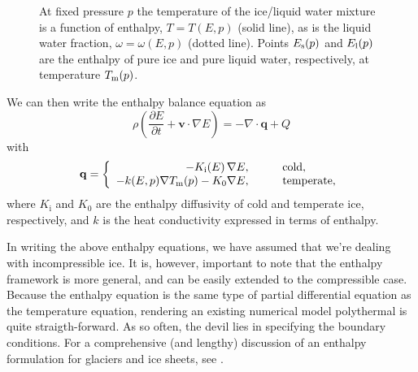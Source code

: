 \documentclass[parskip=half]{scrartcl}
\newcommand{\bq}{\mathbf{q}}
\newcommand{\bv}{\mathbf{v}}
\newcommand{\ddt}[1]{\ensuremath{\frac{\partial #1}{\partial t}}}
\newcommand{\Div}{\nabla\cdot}
\newcommand{\grad}{\nabla}
\begin{document}
\begin{figure} \centering{  }
  \caption{At fixed pressure $p$ the temperature of the ice/liquid
water mixture is a function of enthalpy, $T=T(E,p)$ (solid line), as
is the liquid water fraction, $\omega=\omega(E,p)$ (dotted line).
Points $E_{\text s}(p)$ and $E_{\text l}(p)$ are the enthalpy of pure
ice and pure liquid water, respectively, at temperature $T_{\text
m}(p)$.}
  \label{fig:enthalpy-function}
\end{figure}

We can then write the enthalpy balance equation as
\begin{equation}
  \label{eq:energy-balance} \rho \left(\ddt{E} + \bv \cdot \grad
E\right) = - \Div \bq + Q
\end{equation} with
\begin{equation}\label{eq:enthalpy-flux} {\mathbf q} = \left\{
    \begin{array}{rl} - K_{\text i}(E)\, \nabla E, & \qquad
\text{cold},\\ - k(E,p) \nabla T_{\text m}(p) - K_0 \nabla E, & \qquad
\text{temperate},
    \end{array} \right.
\end{equation} where $K_{\text{i}}$ and $K_0$ are the enthalpy
diffusivity of cold and temperate ice, respectively, and $k$ is the
heat conductivity expressed in terms of enthalpy.

In writing the above enthalpy equations, we have assumed that we're
dealing with incompressible ice. It is, however, important to note
that the enthalpy framework is more general, and can be easily
extended to the compressible case.  Because the enthalpy equation is
the same type of partial differential equation as the temperature
equation, rendering an existing numerical model polythermal is quite
straigth-forward. As so often, the devil lies in specifying the
boundary conditions. For a comprehensive (and lengthy) discussion of
an enthalpy formulation for glaciers and ice sheets, see
\cite{Aschwanden2012}.


\newpage 
\end{document}
